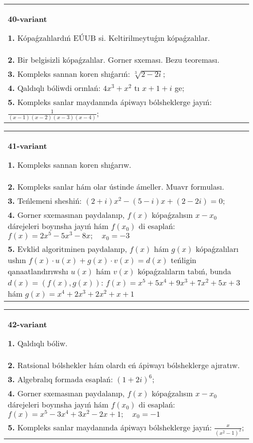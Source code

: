 \documentclass{article}
\begin{document}
\begin{tabular}{m{17cm}}
\textbf{40-variant}
\newline

\textbf{1.} Kópaǵzalılardıń EÚUB si. Keltirilmeytuǵın   kópaǵzalılar. \\
\textbf{2.} Bir belgisizli kópaǵzalılar. Gorner sxeması. Bezu teoreması.  \\
\textbf{3.} Kompleks sannan koren shıǵarıń: $\sqrt[3]{2-2 i}$; \\
\textbf{4.} Qaldıqlı bóliwdi orınlań: $4 x^3+x^2$ tı $x+1+i$ ge; \\
\textbf{5.} Kompleks sanlar maydanında ápiwayı bólsheklerge jayıń: $\frac{1}{(x-1)(x-2)(x-3)(x-4)}$; \\

\end{tabular}
\vspace{1cm}


\begin{tabular}{m{17cm}}
\textbf{41-variant}
\newline

\textbf{1.} Kompleks sannan koren shıǵarıw. \\
\textbf{2.} Kompleks sanlar hám olar ústinde ámeller. Muavr formulası.  \\
\textbf{3.} Teńlemeni sheshiń:  $(2+i) x^2-(5-i) x+(2-2 i)=0$; \\
\textbf{4.} Gorner sxemasınan paydalanıp, $f(x)$ kópaǵzalısın $x-x_0$ dárejeleri boyınsha jayıń hám $f\left(x_0\right)$ di esaplań: $f(x)=2 x^5-5 x^3-8 x ; \quad x_0=-3$ \\
\textbf{5.} Evklid algoritminen paydalanıp, $f(x)$ hám $g(x)$ kópaǵzalıları ushın $f(x) \cdot u(x)+g(x) \cdot v(x)=d(x)$ teńligin qanaatlandırıwshı $u(x)$ hám $v(x)$ kópaǵzalıların tabıń, bunda $d(x)=(f(x), g(x))$:  $f(x)=x^5+5 x^4+9 x^3+7 x^2+5 x+3$ hám $g(x)=x^4+2 x^3+2 x^2+x+1$ \\

\end{tabular}
\vspace{1cm}


\begin{tabular}{m{17cm}}
\textbf{42-variant}
\newline

\textbf{1.} Qaldıqlı bóliw.  \\
\textbf{2.} Ratsional bólshekler hám olardı eń ápiwayı bólsheklerge ajıratıw. \\
\textbf{3.} Algebralıq formada esaplań: $(1+2 i)^6$; \\
\textbf{4.} Gorner sxemasınan paydalanıp, $f(x)$ kópaǵzalısın $x-x_0$ dárejeleri boyınsha jayıń hám $f\left(x_0\right)$ di esaplań: $f(x)=x^5-3 x^4+3 x^2-2 x+1 ; \quad x_0=-1$ \\
\textbf{5.} Kompleks sanlar maydanında ápiwayı bólsheklerge jayıń: $\frac{x}{\left(x^2-1\right)^2}$; \\

\end{tabular}
\vspace{1cm}
\end{document}
